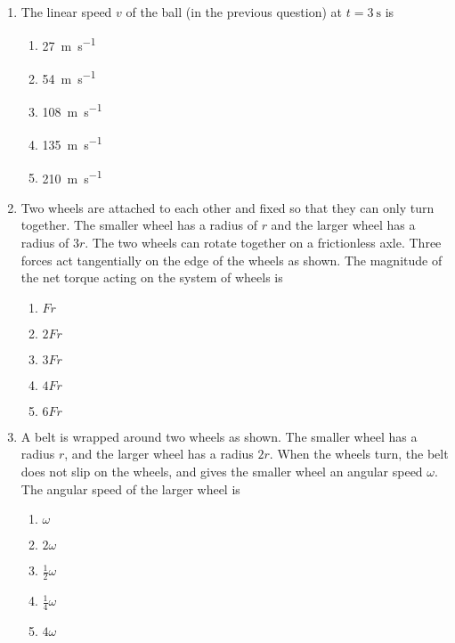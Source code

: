 \documentclass{../../../oss-apphys}
\begin{document}
\begin{multicols}{2}
\begin{enumerate}[leftmargin=18pt]
  \item The linear speed $v$ of the ball (in the previous question) at
    $t=\SI{3}{\second}$ is
    \begin{enumerate}[noitemsep,topsep=0pt,leftmargin=18pt,label=(\Alph*)]
    \item\SI{27 }{\metre\per\second}
    \item\SI{54 }{\metre\per\second}
    \item\SI{108}{\metre\per\second}
    \item\SI{135}{\metre\per\second}
    \item\SI{210}{\metre\per\second}
    \end{enumerate}
  
  \item Two wheels are attached to each other and fixed so that they can only
    turn together. The smaller wheel has a radius of $r$ and the larger wheel
    has a radius of $3r$. The two wheels can rotate together on a frictionless
    axle. Three forces act tangentially on the edge of the wheels as shown.
    The magnitude of the net torque acting on the system of wheels is
    \begin{center}
    \end{center}
    \begin{enumerate}[noitemsep,topsep=0pt,leftmargin=18pt,label=(\Alph*)]
    \item$Fr$
    \item$2Fr$
    \item$3Fr$
    \item$4Fr$
    \item$6Fr$
    \end{enumerate}
    \columnbreak
    
  \item A belt is wrapped around two wheels as shown. The smaller wheel has
    a radius $r$, and the larger wheel has a radius $2r$. When the wheels turn,
    the belt does not slip on the wheels, and gives the smaller wheel an
    angular speed $\omega$. The angular speed of the larger wheel is
    \begin{center}
    \end{center}
    \begin{enumerate}[noitemsep,topsep=0pt,leftmargin=18pt,label=(\Alph*)]
    \item $\displaystyle \omega$
    \item $\displaystyle 2\omega$
    \item $\displaystyle \frac12\omega$
    \item $\displaystyle \frac14\omega$
    \item $\displaystyle 4\omega$
    \end{enumerate}
  \end{enumerate}
\end{multicols}
\end{document}

